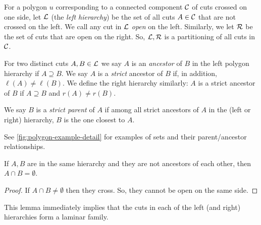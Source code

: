 \begin{definition}
For a polygon $u$ corresponding to a connected component ${\cal C}$ of cuts crossed on one side, let ${\cal L}$ (the {\em left  hierarchy}) be the set of all  cuts $A\in {\cal C}$ that are not crossed on the left.
We call any cut in ${\cal L}$ {\em open} on the left. Similarly, we let ${\cal R}$ be the set of  cuts that are open on the right.
So, ${\cal L},{\cal R}$ is a partitioning of all cuts in ${\cal C}$. 

For two distinct cuts $A,B\in {\cal L}$ we say $A$ is an {\em ancestor} of $B$ in the left polygon hierarchy if $A\supseteq B$. We say $A$ is a {\em strict} ancestor of $B$ if, in addition, $\ell(A) \not= \ell(B)$. We define the right  hierarchy similarly: $A$ is a strict ancestor of $B$ if $A \supseteq B$ and $r(A) \not= r(B)$. 

We say $B$ is a {\em strict parent} of $A$ if among all strict ancestors of $A$ in the (left or right) hierarchy, $B$ is the one closest to $A$.

See \cref{fig:polygon-example-detail} for examples of sets and their parent/ancestor relationships. 
\end{definition}

\begin{fact}\label{lem:same-hieararchy-no-cross}
If $A,B$ are in the same hierarchy and they are not ancestors of each other, then $A\cap B=\emptyset$.	
\end{fact}
\begin{proof}
If $A\cap B\neq \emptyset$ then they cross. So, they cannot be open on the same side.
\end{proof}
This lemma immediately implies that the cuts in each of the left (and right) hierarchies form a laminar family.

